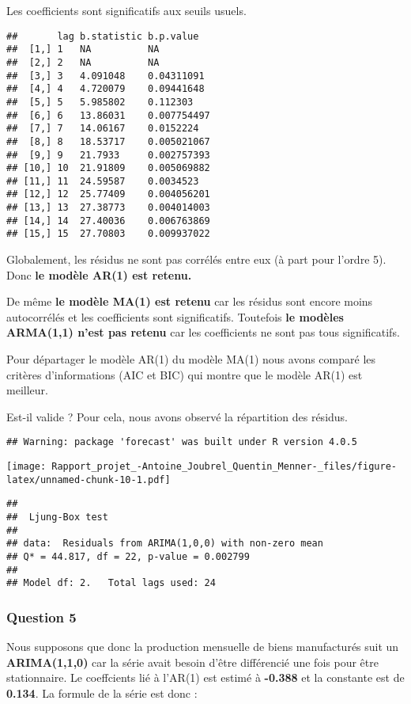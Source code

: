 \documentclass[
  landscape]{article}
\begin{document}
Les coefficients sont significatifs aux seuils usuels.

\begin{verbatim}
##       lag b.statistic b.p.value  
##  [1,] 1   NA          NA         
##  [2,] 2   NA          NA         
##  [3,] 3   4.091048    0.04311091 
##  [4,] 4   4.720079    0.09441648 
##  [5,] 5   5.985802    0.112303   
##  [6,] 6   13.86031    0.007754497
##  [7,] 7   14.06167    0.0152224  
##  [8,] 8   18.53717    0.005021067
##  [9,] 9   21.7933     0.002757393
## [10,] 10  21.91809    0.005069882
## [11,] 11  24.59587    0.0034523  
## [12,] 12  25.77409    0.004056201
## [13,] 13  27.38773    0.004014003
## [14,] 14  27.40036    0.006763869
## [15,] 15  27.70803    0.009937022
\end{verbatim}

Globalement, les résidus ne sont pas corrélés entre eux (à part pour
l'ordre 5). Donc \textbf{le modèle AR(1) est retenu.}

De même \textbf{le modèle MA(1) est retenu} car les résidus sont encore
moins autocorrélés et les coefficients sont significatifs. Toutefois
\textbf{le modèles ARMA(1,1) n'est pas retenu} car les coefficients ne
sont pas tous significatifs.

Pour départager le modèle AR(1) du modèle MA(1) nous avons comparé les
critères d'informations (AIC et BIC) qui montre que le modèle AR(1) est
meilleur.

Est-il valide ? Pour cela, nous avons observé la répartition des
résidus.

\begin{verbatim}
## Warning: package 'forecast' was built under R version 4.0.5
\end{verbatim}

\texttt{[image: Rapport\_projet\_-Antoine\_Joubrel\_Quentin\_Menner-\_files/figure-latex/unnamed-chunk-10-1.pdf]}

\begin{verbatim}
## 
##  Ljung-Box test
## 
## data:  Residuals from ARIMA(1,0,0) with non-zero mean
## Q* = 44.817, df = 22, p-value = 0.002799
## 
## Model df: 2.   Total lags used: 24
\end{verbatim}

\hypertarget{question-5}{%
\subsubsection{Question 5}\label{question-5}}

Nous supposons que donc la production mensuelle de biens manufacturés
suit un \textbf{ARIMA(1,1,0)} car la série avait besoin d'être
différencié une fois pour être stationnaire. Le coeffcients lié à
l'AR(1) est estimé à \textbf{-0.388} et la constante est de
\textbf{0.134}. La formule de la série est donc :
\end{document}
